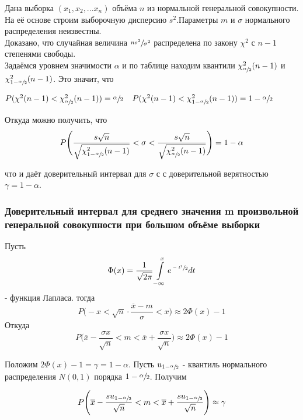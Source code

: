 Дана выборка $(x_1, x_2, ... x_n)$ объёма $n$ из нормальной генеральной совокупности. На её основе строим выборочную дисперсию $s^2$.Параметры $m$ и $\sigma$ нормального распределения неизвестны.\\
Доказано, что случайная величина $\sfrac{ns^2}{\sigma^2}$ распределена по закону $\chi^2$ с $n-1$ степенями свободы.\\
Задаёмся уровнем значимости $\alpha$ и по таблице находим квантили $\chi_{\sfrac{\alpha}{2}}^{2}(n-1)$ и $\chi_{1 - \sfrac{\alpha}{2}}^{2}(n-1)$. Это значит, что\\
\begin{center}
    $P(\chi^{2}(n - 1) < \chi_{\sfrac{\alpha}{2}}^{2}(n-1)) = \sfrac{\alpha}{2}\;\;\;\;
    P(\chi^{2}(n - 1) < \chi_{1 - \sfrac{\alpha}{2}}^{2}(n-1)) = 1 - \sfrac{\alpha}{2}$
\end{center}
\noindent Откуда можно получить, что 
\begin{equation}
    P\Bigg(\dfrac{s\sqrt{n}}{\sqrt{\chi_{1 - \sfrac{\alpha}{2}}^{2}(n-1)}} < \sigma < \dfrac{s\sqrt{n}}{\sqrt{\chi_{\sfrac{\alpha}{2}}^{2}(n-1)}}\Bigg) = 1 - \alpha
    \label{eq17}
\end{equation}

\noindent что и даёт доверительный интервал для $\sigma$ с с доверительной верятностью $\gamma = 1 - \alpha$. 



\subsubsection{Доверительный интервал для среднего значения m произвольной генеральной совокупности при большом объёме выборки}

Пусть 
\begin{equation*}
    \Phi(x) = \dfrac{1}{\sqrt{2\pi}} \int \limits_{-\infty}
 ^{x}e^{\sfrac{-t^2}{2}}dt
 \end{equation*}
\noindent - функция Лапласа. тогда
$$P\Bigg(-x < \sqrt{n}\cdot \dfrac{\overline{x} - m}{\sigma} < x\Bigg) \approx 2\Phi(x) - 1$$
\noindent Откуда 
$$P\Bigg(\overline{x} - \dfrac{\sigma x}{\sqrt{n}} < m < \overline{x} + \dfrac{\sigma x}{\sqrt{n}}\Bigg) \approx 2\Phi(x) - 1$$

\noindent Положим $2\Phi(x) - 1 = \gamma = 1 -\alpha$. Пусть $u_{1 - \sfrac{\alpha}{2}}$ - квантиль нормального распределения $N(0, 1)$ порядка $1 - \sfrac{\alpha}{2}$. Получим

\begin{equation}
    P\Bigg(\overline{x} - \dfrac{su_{1 - \sfrac{\alpha}{2}}}{\sqrt{n}} < m < \overline{x} + \dfrac{su_{1 - \sfrac{\alpha}{2}}}{\sqrt{n}}\Bigg) \approx \gamma
    \label{eq18}
\end{equation}

